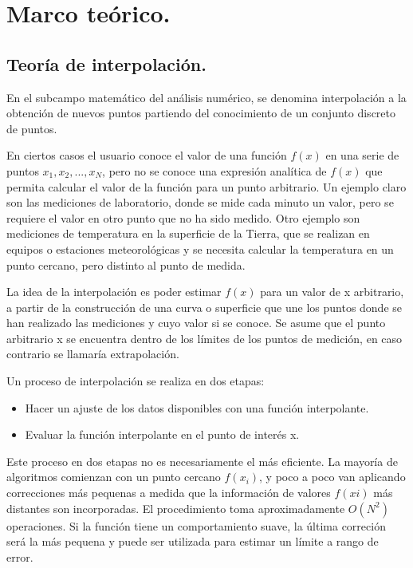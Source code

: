 \chapter{Marco te\'orico.}

\section{Teor\'ia de interpolaci\'on.}

\hspace{0.4cm} En el subcampo matem\'atico del an\'alisis num\'erico, se denomina interpolaci\'on a la obtenci\'on de nuevos puntos partiendo del conocimiento de un conjunto discreto de puntos.


\hspace{0.4cm} En ciertos casos el usuario conoce el valor de una funci\'on $f(x)$ en una serie de puntos $x_{1}, x_{2},..., x_{N}$, pero no se conoce una 
expresi\'on anal\'itica de $f(x)$ que permita calcular el valor de la funci\'on para un punto arbitrario. Un ejemplo claro son las mediciones de laboratorio, donde se mide cada minuto un valor, pero se requiere el valor en otro punto que no ha sido medido. Otro ejemplo son mediciones de temperatura en la superficie
de la Tierra, que se realizan en equipos o estaciones meteorol\'ogicas y se necesita calcular la temperatura en un punto cercano, pero distinto al punto de medida.

\hspace{0.4cm} La idea de la interpolaci\'on es poder estimar $f(x)$ para un valor de x arbitrario, a partir de la construcci\'on de una curva o superficie que une los puntos donde se han realizado las mediciones y cuyo valor si se conoce. Se asume que el punto arbitrario x se encuentra dentro de los l\'imites de los puntos de medici\'on, en caso contrario se llamar\'ia extrapolaci\'on. 

\hspace{0.4cm} Un proceso de interpolaci\'on se realiza en dos etapas:

\begin{itemize}
  \item Hacer un ajuste de los datos disponibles con una funci\'on interpolante.
  \item Evaluar la funci\'on interpolante en el punto de inter\'es x.
\end{itemize}


\hspace{0.4cm} Este proceso en dos etapas no es necesariamente el m\'as 
eficiente. La mayor\'ia de algoritmos comienzan con un punto cercano $f(x_{i})$, y poco a poco van aplicando correcciones m\'as pequenas a medida que la 
informaci\'on de valores $f(xi)$ m\'as distantes son incorporadas. El procedimiento toma aproximadamente $O(N^{2})$ operaciones. Si la funci\'on tiene un comportamiento suave, la \'ultima correci\'on ser\'a la m\'as pequena y puede ser utilizada para estimar un l\'imite a rango de error.


